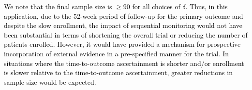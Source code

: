 \documentclass[12pt]{article}
\begin{document}
\textcolor{black}{We note that the final sample size is $\ge 90$ for all choices of $\delta$. Thus, in this application, due to the 52-week period of follow-up for the primary outcome and despite the slow enrollment, the impact of sequential monitoring would not have been substantial in terms of shortening the overall trial or reducing the number of patients enrolled. However, it would have provided a mechanism for prospective incorporation of external evidence in a pre-specified manner for the trial. In situations where the time-to-outcome ascertainment is shorter and/or enrollment is slower relative to the time-to-outcome ascertainment, greater reductions in sample size would be expected.}
\end{document}
